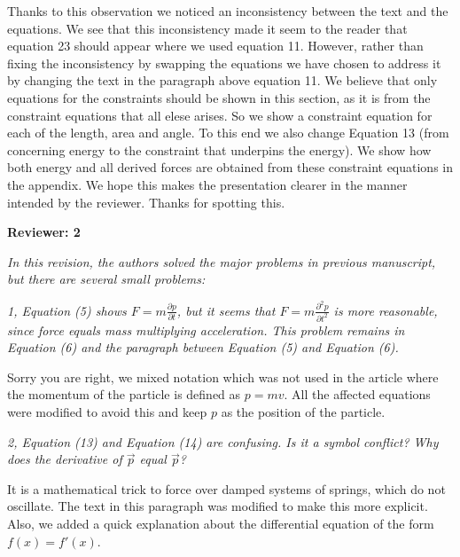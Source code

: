 \documentclass[letterpaper,12pt]{letter}
\begin{document}
Thanks to this observation we noticed an inconsistency between the text and the equations. We see that this inconsistency made it seem to the reader that equation 23 should appear where we used equation 11.  However, rather than fixing the inconsistency by swapping the equations we have chosen to address it by changing the text in the paragraph above equation 11. We believe that only equations for the constraints should be shown in this section, as it is from the constraint equations that all elese arises. So we show a constraint equation for each of the length, area and angle. To this end we also change Equation 13 (from concerning energy to the constraint that underpins the energy). We show how both energy and all derived forces are obtained from these constraint equations in the appendix.  We hope this makes the presentation clearer in the manner intended by the reviewer. Thanks for spotting this.

\textbf{Reviewer: 2}

{\em In this revision, the authors solved the major problems in previous manuscript, but there are several small problems:}

{\em 1, Equation (5) shows $F=m\frac{\partial p}{\partial t}$, but it seems that $F=m\frac{\partial^2 p}{\partial t^2}$ is more reasonable, since force equals mass multiplying acceleration. This problem remains in Equation (6) and the paragraph between Equation (5) and Equation (6).}

Sorry you are right, we mixed notation which was not used in the article where the momentum of the particle is defined as $p=mv$.  All the affected equations were modified to avoid this and keep $p$ as the position of the particle.

{\em 2, Equation (13) and Equation (14) are confusing. Is it a symbol conflict? Why does the derivative of $\vec{p}$ equal $\vec{p}$?}

It is a mathematical trick to force over damped systems of springs, which do not oscillate.  The text in this paragraph was modified to make this more explicit.  Also, we added a quick explanation about the differential equation of the form $f(x) = f'(x)$.
\end{document}
